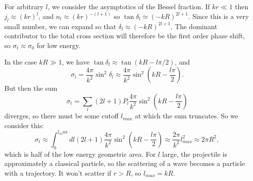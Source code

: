 \documentclass[fontsize=12pt]{scrartcl}
\begin{document}
For arbitrary $l$, we consider the asymptotics of the Bessel fraction. If $kr\ll 1$ then $j_l \approx (kr)^l$, and $n_l\approx (kr)^{-(l+1)}$ so $\tan\delta_l\simeq (-kR)^{2l+1}$. Since this is a very small number, we can expand so that $\delta_l\approx(-kR)^{2l+1}$. The dominant contributor to the total cross section will therefore be the first order phase shift, so $\sigma_t\approx \sigma_0$ for low energy.

In the case $kR\gg1$, we have $\tan\delta_l\approx \tan(kR-l\pi/2)$, and $$\sigma_l=\frac{4\pi}{k^2}\sin^2\delta_l \approx \frac{4\pi}{k^2}\sin^2(kR-\frac{l\pi}{2}).$$ But then the sum $$\sigma_t=\sum_l(2l+1)P_l \frac{4\pi}{k^2}\sin^2\left(kR-\frac{l\pi}{2}\right)$$ diverges, so there must be some cutoff $l_{max}$ at which the sum truncates. So we consider this: $$\sigma_t\approx\int_0^{l_max} dl (2l+1)\frac{4\pi}{k^2}\sin^2\left(kR-\frac{l\pi}{2}\right)\approx \frac{2\pi}{k^2}l_{max}^2\approx 2\pi R^2,$$ which is half of the low energy geometric area. For $l$ large, the projectile is approximately a classical particle, so the scattering of a wave becomes a particle with a trajectory. It won't scatter if $r>R$, so $l_{max}=kR$.
\end{document}
